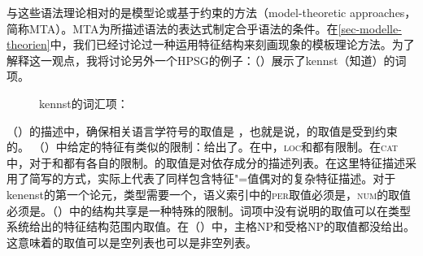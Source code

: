 与这些语法理论相对的是模型论或基于约束的方法（model-theoretic approaches，简称MTA）。MTA为所描述语法的表达式制定合乎语法的条件。在\ref{sec-modelle-theorien}中，我们已经讨论过一种运用特征结构来刻画现象的模板理论方法。为了解释这一观点，我将讨论另外一个HPSG的例子：（）展示了kennst（知道）的词项。
\begin{figure}
\eas
kennst的词汇项：\\
\label{le-kennst-mts}%
\zs
\vspace{-\baselineskip}
\end{figure}
（）的描述中，确保相关语言学符号的\phonvc 取值是 ，也就是说，\phonc 的取值是受到约束的。 （）中给定的特征有类似的限制：给出了\synsemvc。在\synsemc 中，\textsc{loc}和\nonlocvc 都有限制。在\textsc{cat}中，对于\headc 和\subcatc 都有各自的限制。\subcatc 的取值是对依存成分的描述列表。在这里特征描述采用了简写的方式，实际上代表了同样包含特征"=值偶对的复杂特征描述。对于kenenst的第一个论元，类型需要一个\headvc，语义索引中的\textsc{per}取值必须是，\textsc{num}的取值必须是。（）中的结构共享是一种特殊的限制。词项中没有说明的取值可以在类型系统给出的特征结构范围内取值。在（）中，主格NP和受格NP的\slashvc 取值都没给出。这意味着\slaschc 的取值可以是空列表也可以是非空列表。
